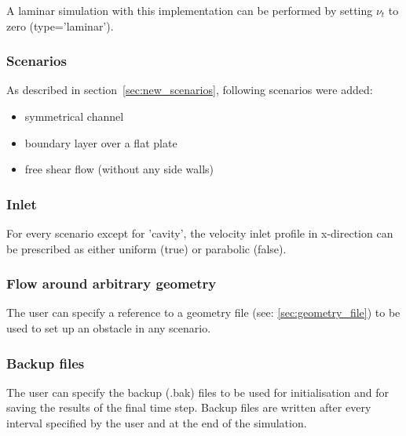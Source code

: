 
\noii A laminar simulation with this implementation can be performed by setting $\nu_t$ to zero (type='laminar').

\subsubsection*{Scenarios}

As described in section~\ref{sec:new_scenarios}, following scenarios were added:

\begin{itemize}
\item symmetrical channel
\item boundary layer over a flat plate
\item free shear flow (without any side walls)
\end{itemize}

\subsubsection*{Inlet}

For every scenario except for 'cavity', the velocity inlet profile in x-direction can be prescribed as either uniform (true) or parabolic (false).


\subsubsection*{Flow around arbitrary geometry}

The user can specify a reference to a geometry file (see: \ref{sec:geometry_file}) to be used to set up an obstacle in any scenario.




\subsubsection*{Backup files}

The user can specify the backup (.bak) files to be used for initialisation and for saving the results of the final time step. Backup files are written after every interval specified by the user and at the end of the simulation.

